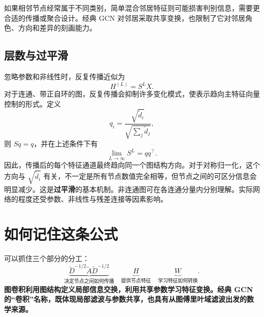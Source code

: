 \documentclass[UTF8,a4paper,11pt,fontset=fandol]{ctexart}
\begin{document}
如果相邻节点经常属于不同类别，简单混合邻居特征则可能损害判别信息，需要更合适的传播或聚合设计。经典 GCN 对邻居采取共享变换，也限制了它对邻居角色、方向和差异的刻画能力。

\subsection{层数与过平滑}
忽略参数和非线性时，反复传播近似为
\begin{equation}
H^{(L)}=S^LX.
\end{equation}
对于连通、带正自环的图，反复传播会抑制许多变化模式，使表示趋向主特征向量控制的形式。定义
\begin{equation}
q_i=\frac{\sqrt{\widetilde d_i}}{\sqrt{\sum_j\widetilde d_j}},
\end{equation}
则 $Sq=q$，并在上述条件下有
\begin{equation}
\lim_{L\to\infty}S^L=qq^\top.
\end{equation}
因此，传播后的每个特征通道最终趋向同一个图结构方向。对于对称归一化，这个方向与 $\sqrt{\widetilde d_i}$ 有关，不一定是所有节点数值完全相等，但节点之间的可区分信息会明显减少。这是\textbf{过平滑}的基本机制。非连通图可在各连通分量内分别理解。实际网络的程度还受参数、非线性与残差连接等因素影响。

\section{如何记住这条公式}
可以抓住三个部分的分工：
\begin{equation}
\underbrace{\widetilde D^{-1/2}\widetilde A\widetilde D^{-1/2}}_{\text{决定节点之间如何传播}}
\quad
\underbrace{H}_{\text{提供节点特征}}
\quad
\underbrace{W}_{\text{学习特征如何转换}}.
\end{equation}
\textbf{图卷积利用图结构定义局部信息交换，利用共享参数学习特征变换。经典 GCN 的“卷积”名称，既体现局部滤波与参数共享，也具有从图傅里叶域滤波出发的数学来源。}
\end{document}
